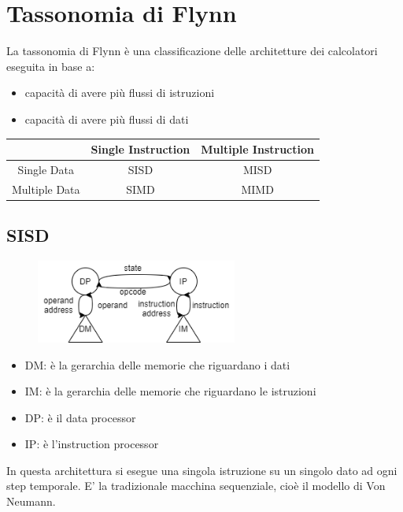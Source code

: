\section{Tassonomia di Flynn}
La tassonomia di Flynn è una classificazione delle architetture dei calcolatori eseguita in base a:
\begin{itemize}
    \item capacità di avere più flussi di istruzioni
    \item capacità di avere più flussi di dati
\end{itemize}

\begin{table}[H]
    \centering
    \begin{tabular}{c|c|c}
        & Single Instruction & Multiple Instruction  \\
        \hline
        Single Data & SISD & MISD \\
        \hline
        Multiple Data & SIMD & MIMD \\
    \end{tabular}
\end{table}

\subsection{SISD}
\begin{figure}[H]
    \centering
    \includegraphics[width=250px]{images/2_Tassonomia_di_Flynn/SISD.png}
\end{figure}

\begin{itemize}
    \item DM: è la gerarchia delle memorie che riguardano i dati
    \item IM: è la gerarchia delle memorie che riguardano le istruzioni
    \item DP: è il data processor
    \item IP: è l'instruction processor
\end{itemize}
In questa architettura si esegue una singola istruzione su un singolo dato ad ogni step temporale. E' la tradizionale macchina sequenziale, cioè il modello di Von Neumann.

